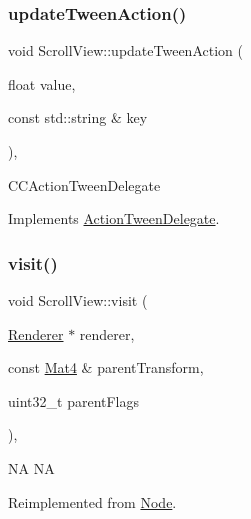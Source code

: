 \subsubsection{\texorpdfstring{update\+Tween\+Action()}{updateTweenAction()}\hspace{0.1cm}{\footnotesize\ttfamily [2/2]}}
{\footnotesize\ttfamily void Scroll\+View\+::update\+Tween\+Action (\begin{DoxyParamCaption}\item[{float}]{value,  }\item[{const std\+::string \&}]{key }\end{DoxyParamCaption})\hspace{0.3cm}{\ttfamily [override]}, {\ttfamily [virtual]}}

C\+C\+Action\+Tween\+Delegate 

Implements \hyperlink{classActionTweenDelegate_a6cb6dce375e29bd38af1a81001eeac66}{Action\+Tween\+Delegate}.

\mbox{\label{classScrollView_a9766dfe15b34a8d7d1e3fd7b6acfcc32}} 
\subsubsection{\texorpdfstring{visit()}{visit()}\hspace{0.1cm}{\footnotesize\ttfamily [1/2]}}
{\footnotesize\ttfamily void Scroll\+View\+::visit (\begin{DoxyParamCaption}\item[{\hyperlink{classRenderer}{Renderer} $\ast$}]{renderer,  }\item[{const \hyperlink{classMat4}{Mat4} \&}]{parent\+Transform,  }\item[{uint32\+\_\+t}]{parent\+Flags }\end{DoxyParamCaption})\hspace{0.3cm}{\ttfamily [override]}, {\ttfamily [virtual]}}

NA  NA 

Reimplemented from \hyperlink{classNode_a7d794a5e30745611ec33881a625edf26}{Node}.

\mbox{\label{classScrollView_a7aee8e0ccdc8235a7ed9e2932ccdcf25}} 
